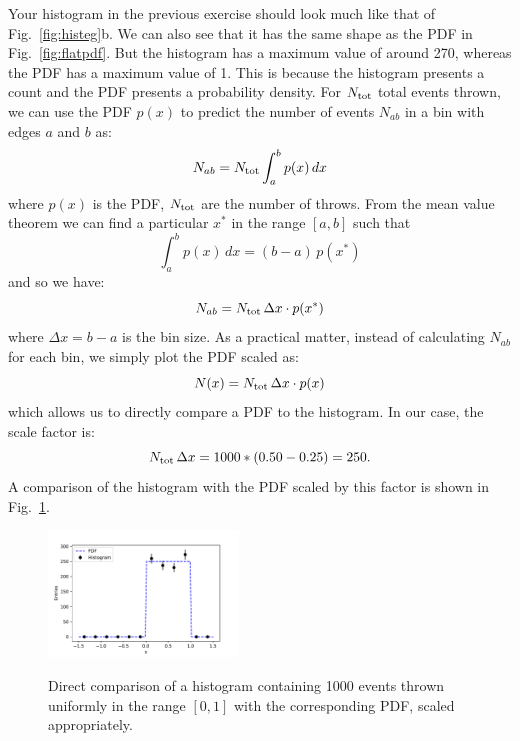 {Your histogram in the previous exercise should look much like that of
Fig.~\ref{fig:histeg}b.  We can also see that it has the same shape as
the PDF in Fig.~\ref{fig:flatpdf}.  But the histogram has a maximum
value of around 270, whereas the PDF has a maximum value of 1.  This
is because the histogram presents a count and the PDF presents a
probability density.  For $N_{\rm tot}$ total events thrown, we can
use the PDF $p(x)$ to predict the number of events $N_{ab}$ in a bin
with edges $a$ and $b$ as:
\begin{displaymath}
N_{ab} = N_{\rm tot} \int_a^b p(x) \, dx \\
\end{displaymath}
where $p(x)$ is the PDF, $N_{\rm tot}$ are the number of throws.  From
the mean value theorem we can find a particular $x^*$ in the range
$[a,b]$ such that
\begin{displaymath}
\int_a^b p(x) \, dx = (b-a) \, p(x^*)
\end{displaymath}
and so we have:
\begin{displaymath}
N_{ab} = N_{\rm tot} \, \Delta x \cdot p(x^*) \\
\end{displaymath}
where $\Delta x = b-a$ is the bin size.  As a practical matter, 
instead of calculating $N_{ab}$ for each bin, we simply plot the PDF scaled as:
\begin{displaymath}
N(x) = N_{\rm tot} \, \Delta x \cdot p(x)  \\
\end{displaymath}
which allows us to directly compare a PDF to the histogram.  In our case, the scale factor is:
\begin{displaymath}
N_{\rm tot} \, \Delta x = 1000 * (0.50-0.25) = 250.
\end{displaymath}
A comparison of the histogram with the PDF scaled by this factor is shown in Fig.~\ref{fig:histpdf}.\\

\begin{figure}[htbp]
\begin{center}
{\includegraphics[width=0.45\textwidth]{figs/hist/histpdf.pdf}}
\end{center}
\caption{\label{fig:histpdf} Direct comparison of a histogram containing 1000 events thrown uniformly in the range $[0,1]$ with the corresponding PDF, scaled appropriately.}
\end{figure}

}
